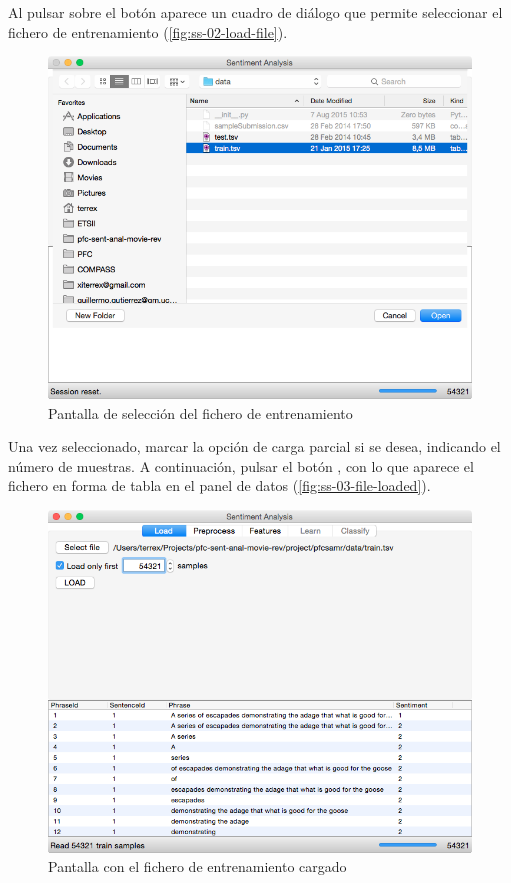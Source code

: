 Al pulsar sobre el botón  aparece un cuadro de diálogo que permite seleccionar el fichero  de entrenamiento (\autoref{fig:ss-02-load-file}).

\begin{figure}[H]
\centering
\includegraphics[width=12cm]{ss-02-load-file}
\caption{Pantalla de selección del fichero de entrenamiento}
\label{fig:ss-02-load-file}
\end{figure}

\newpage
Una vez seleccionado, marcar la opción de carga parcial si se desea, indicando el número de muestras. A continuación, pulsar el botón , con lo que aparece el fichero en forma de tabla en el panel de datos (\autoref{fig:ss-03-file-loaded}).

\begin{figure}[H]
\centering
\includegraphics[width=12cm]{ss-03-file-loaded}
\caption{Pantalla con el fichero de entrenamiento cargado}
\label{fig:ss-03-file-loaded}
\end{figure}

